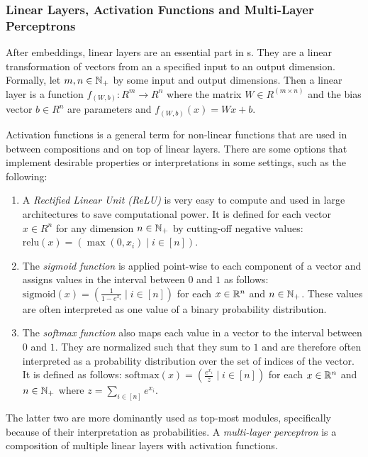 \documentclass[../document.tex]{subfiles}
\begin{document}
    \subsubsection{Linear Layers, Activation Functions and Multi-Layer Perceptrons}
    After embeddings, linear layers are an essential part in s.
    They are a linear transformation of vectors from an a specified input to an output dimension.
    Formally, let \(m, n \in \mathbb{N}_+\) by some input and output dimensions.
    Then a linear layer is a function \(f_{(W,b)}\colon R^m \to R^n\) where the matrix \(W \in R^{(m\times n)}\) and the bias vector \(b\in R^n\) are parameters and \(f_{(W,b)}(x) = Wx+b\).

    Activation functions is a general term for non-linear functions that are used in between compositions and on top of linear layers.
    There are some options that implement desirable properties or interpretations in some settings, such as the following:
    \begin{enumerate}
        \item
            A \emph{Rectified Linear Unit (ReLU)} is very easy to compute and used in large architectures to save computational power.
            It is defined for each vector \(x\in R^n\) for any dimension \(n \in \mathbb{N}_+\) by cutting-off negative values: \(\mathrm{relu}(x) = (\max(0, x_i) \mid i \in [n])\).
        \item
            The \emph{sigmoid function} is applied point-wise to each component of a vector and assigns values in the interval between \(0\) and \(1\) as follows: \(\mathrm{sigmoid}(x) = (\frac{1}{1-e^{x_i}} \mid i \in [n])\) for each \(x \in \mathbb{R}^n\) and \(n \in \mathbb{N}_+\).
            These values are often interpreted as one value of a binary probability distribution.
        \item
            The \emph{softmax function} also maps each value in a vector to the interval between \(0\) and \(1\).
            They are normalized such that they sum to \(1\) and are therefore often interpreted as a probability distribution over the set of indices of the vector.
            It is defined as follows: \(\mathrm{softmax}(x) = (\frac{e^{x_i}}{z} \mid i \in [n])\) for each \(x\in \mathbb{R}^n\) and \(n \in \mathbb{N}_+\) where \(z = \sum_{i \in [n]} e^{x_i}\).
    \end{enumerate}
    The latter two are more dominantly used as top-most modules, specifically because of their interpretation as probabilities.
    A \emph{multi-layer perceptron} is a composition of multiple linear layers with activation functions.
\end{document}
